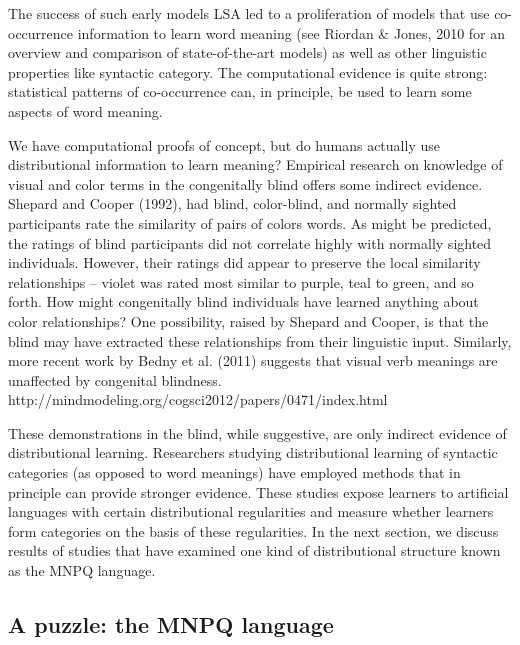 \documentclass[man,floatsintext]{apa6}
\begin{document}
The success of such early models LSA led to a proliferation of
models that use co-occurrence information to learn word meaning (see
Riordan \& Jones, 2010 for an overview and comparison of
state-of-the-art models) as well as other linguistic properties like
syntactic category. The computational evidence is quite strong:
statistical patterns of co-occurrence can, in principle, be used to
learn some aspects of word meaning.

We have computational proofs of concept, but do humans actually use
distributional information to learn meaning? Empirical research on
knowledge of visual and color terms in the congenitally blind offers
some indirect evidence. Shepard and Cooper (1992), had blind,
color-blind, and normally sighted participants rate the similarity of
pairs of colors words. As might be predicted, the ratings of blind
participants did not correlate highly with normally sighted
individuals. However, their ratings did appear to preserve the local
similarity relationships -- violet was rated most similar to purple,
teal to green, and so forth. How might congenitally blind individuals
have learned anything about color relationships? One possibility,
raised by Shepard and Cooper, is that the blind may have extracted
these relationships from their linguistic input. Similarly, more
recent work by Bedny et al. (2011) suggests that visual verb meanings
are unaffected by congenital blindness. %
http://mindmodeling.org/cogsci2012/papers/0471/index.html

These demonstrations in the blind, while suggestive, are only indirect
evidence of distributional learning. Researchers studying
distributional learning of syntactic categories (as opposed to word
meanings) have employed methods that in principle can provide stronger
evidence. These studies expose learners to artificial languages with
certain distributional regularities and measure whether learners form
categories on the basis of these regularities. In the next section, we
discuss results of studies that have examined one kind of
distributional structure known as the MNPQ language.

\subsection{A puzzle: the MNPQ language}
\end{document}
